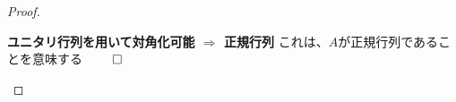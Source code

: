 \documentclass[../../../topic_linear-algebra]{subfiles}
\begin{document}
\begin{proof}
\begin{subpattern}{\bfseries ユニタリ行列を用いて対角化可能 $\Longrightarrow$ 正規行列}
    これは、$A$が正規行列であることを意味する $\qed$
  \end{subpattern}
\end{proof}
\end{document}

